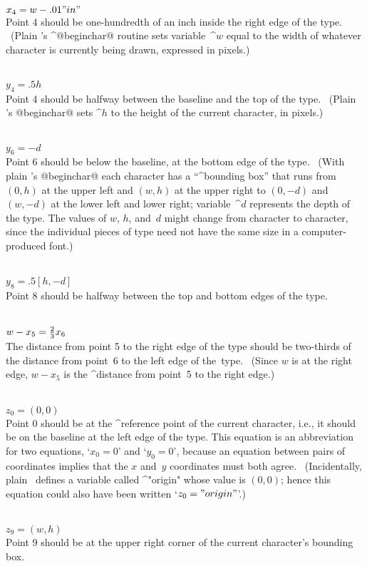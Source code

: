 {{{{\\$x_4=w-.01"in"$\\
Point 4 should be one-hundredth of an inch inside the right edge of
the type. \ (Plain \MF's ^@beginchar@ routine sets variable~^{$w$} equal
to the width of whatever character is currently being drawn, expressed in
pixels.)

\\$y_4=.5h$\\
Point 4 should be halfway between the baseline and the top of the type.
\ (Plain \MF's @beginchar@ sets ^{$h$} to the height of the
current character, in pixels.)

\\$y_6=-d$\\
Point 6 should be below the baseline, at the bottom edge of the type.
\ (With plain \MF's @beginchar@ each
character has a ``^{bounding box}'' that runs from $(0,h)$
at the upper left and $(w,h)$ at the upper right to $(0,-d)$ and~$(w,-d)$
at the lower left and lower right; variable~^{$d$} represents the depth of
the type. The values of $w$, $h$, and~$d$ might change from character to
character, since the individual pieces of type need not have the same size
in a computer-produced font.)

\\$y_8=.5[h,-d]$\\
Point 8 should be halfway between the top and bottom edges of the type.

\\$w-x_5={2\over3}x_6$\\
The distance from point 5 to the right edge of the type should be
two-thirds of the distance from point~6 to the left edge of the~type.
\ (Since $w$ is at the right edge, $w-x_5$ is the ^{distance} from
point~5 to the right edge.)

\\$z_0=(0,0)$\\
Point 0 should be at the ^{reference point} of the current character,
i.e., it should be on the baseline at the left edge of the type.
This equation is an abbreviation for two equations, `$x_0=0$' and `$y_0=0$',
because an equation between pairs of coordinates implies that the $x$
and~$y$ coordinates must both agree. \ (Incidentally, plain \MF\
defines a variable called ^"origin" whose value is $(0,0)$; hence
this equation could also have been written `$z_0="origin"$'.)

\\$z_9=(w,h)$\\
Point 9 should be at the upper right corner of the current character's
bounding box.

}}}}

